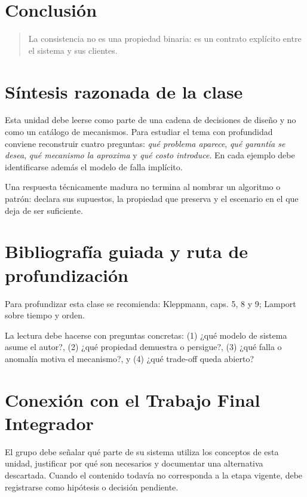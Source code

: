 \documentclass[variant=apuntes,cover=institutional,mode=screen]{ua-engineering-v6-article}
\begin{document}
\section{Conclusión}

\begin{quote}
La consistencia no es una propiedad binaria: es un contrato explícito entre el sistema y sus clientes.
\end{quote}


\section{Síntesis razonada de la clase}
Esta unidad debe leerse como parte de una cadena de decisiones de diseño y no como un catálogo de mecanismos. Para estudiar el tema con profundidad conviene reconstruir cuatro preguntas: \emph{qué problema aparece}, \emph{qué garantía se desea}, \emph{qué mecanismo la aproxima} y \emph{qué costo introduce}. En cada ejemplo debe identificarse además el modelo de falla implícito.

\begin{uakeybox}
Una respuesta técnicamente madura no termina al nombrar un algoritmo o patrón: declara sus supuestos, la propiedad que preserva y el escenario en el que deja de ser suficiente.
\end{uakeybox}

\section{Bibliografía guiada y ruta de profundización}
Para profundizar esta clase se recomienda: Kleppmann, caps. 5, 8 y 9; Lamport sobre tiempo y orden.

La lectura debe hacerse con preguntas concretas: (1) ¿qué modelo de sistema asume el autor?, (2) ¿qué propiedad demuestra o persigue?, (3) ¿qué falla o anomalía motiva el mecanismo?, y (4) ¿qué trade-off queda abierto?

\section{Conexión con el Trabajo Final Integrador}
El grupo debe señalar qué parte de su sistema utiliza los conceptos de esta unidad, justificar por qué son necesarios y documentar una alternativa descartada. Cuando el contenido todavía no corresponda a la etapa vigente, debe registrarse como hipótesis o decisión pendiente.
\end{document}
